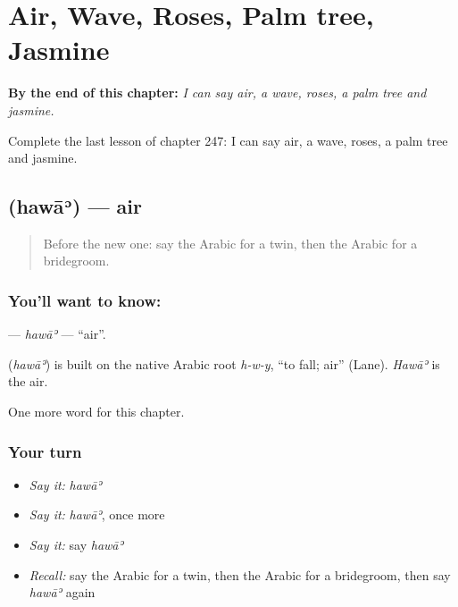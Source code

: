 
\chapter{Air, Wave, Roses, Palm tree, Jasmine}
\label{ch:ar-air-wave-roses-palm-tree-jasmine}

\begin{chapteropening}
\textbf{By the end of this chapter:} \emph{I can say air, a wave, roses, a palm tree and jasmine.}

Complete the last lesson of chapter 247: I can say air, a wave, roses, a palm tree and jasmine.
\end{chapteropening}

\section[\texorpdfstring{\ar{هواء} (hawāʾ)}{هواء (hawāʾ)}]{ (hawāʾ) — air}

\label{lesson:AR-C247-hawa}



\begin{quote}
Before the new one: say the Arabic for a twin, then the Arabic for a bridegroom.
\end{quote}

\subsection*{You'll want to know: }
\textbf{} — \emph{hawāʾ} — \textquotedblleft{}air\textquotedblright{}.

\begin{cousinweb}
\textbf{} (\emph{hawāʾ}) is built on the native Arabic root \emph{h-w-y}, \textquotedblleft{}to fall; air\textquotedblright{} (Lane). \emph{Hawāʾ} is the air.
\end{cousinweb}

\begin{grammarlens}[title={What you've built}]
One more word for this chapter.
\end{grammarlens}

\subsection*{Your turn}
\begin{itemize}
\raggedright
  \item \emph{Say it:} \emph{hawāʾ}
  \item \emph{Say it:} \emph{hawāʾ}, once more
  \item \emph{Say it:} say \emph{hawāʾ}
  \item \emph{Recall:} say the Arabic for a twin, then the Arabic for a bridegroom, then say \emph{hawāʾ} again
\end{itemize}

